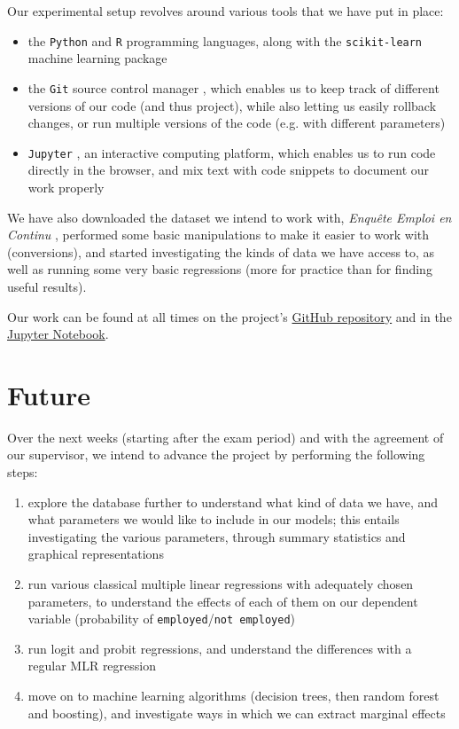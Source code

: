 \documentclass[a4paper]{article}
\begin{document}
Our experimental setup revolves around various tools that we have put in place:
\begin{itemize}
    \item the \texttt{Python} and \texttt{R} programming languages, along with the \texttt{scikit-learn} machine learning package \cite{python}\cite{R}\cite{learn}
    \item the \texttt{Git} source control manager \cite{git}, which enables us to keep track of different versions of our code (and thus project), while also letting us easily rollback changes, or run multiple versions of the code (e.g. with different parameters)
    \item \texttt{Jupyter} \cite{jupyter}, an interactive computing platform, which enables us to run code directly in the browser, and mix text with code snippets to document our work properly
\end{itemize}

We have also downloaded the dataset we intend to work with, \emph{Enqu\^ete Emploi en Continu} \cite{enquete}, performed some basic manipulations to make it easier to work with (conversions), and started investigating the kinds of data we have access to, as well as running some very basic regressions (more for practice than for finding useful results).

Our work can be found at all times on the project's \href{https://github.com/ncocacola/econml/}{GitHub repository} and in the \href{https://github.com/ncocacola/econml/blob/master/econml.ipynb}{Jupyter Notebook}.

\section{Future}
Over the next weeks (starting after the exam period) and with the agreement of our supervisor, we intend to advance the project by performing the following steps:
\begin{enumerate}
    \item explore the database further to understand what kind of data we have, and what parameters we would like to include in our models; this entails investigating the various parameters, through summary statistics and graphical representations
    \item run various classical multiple linear regressions with adequately chosen parameters, to understand the effects of each of them on our dependent variable (probability of \texttt{employed}/\texttt{not employed})
    \item run logit and probit regressions, and understand the differences with a regular MLR regression
    \item move on to machine learning algorithms (decision trees, then random forest and boosting), and investigate ways in which we can extract marginal effects
\end{enumerate}
\end{document}
